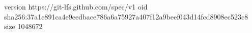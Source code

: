 version https://git-lfs.github.com/spec/v1
oid sha256:37a1e891ca4e9eedbace786a6a75927a407f12a9beef043d14fcd8908ec523c8
size 1048672
